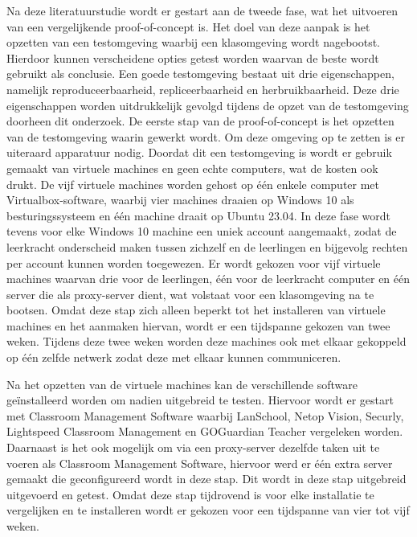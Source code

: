 Na deze literatuurstudie wordt er gestart aan de tweede fase, wat het uitvoeren van een vergelijkende proof-of-concept is. Het doel van deze aanpak is het opzetten van een testomgeving waarbij een klasomgeving wordt nagebootst. Hierdoor kunnen verscheidene opties getest worden waarvan de beste wordt gebruikt als conclusie. Een goede testomgeving bestaat uit drie eigenschappen, namelijk reproduceerbaarheid, repliceerbaarheid en herbruikbaarheid. Deze drie eigenschappen worden uitdrukkelijk gevolgd tijdens de opzet van de testomgeving doorheen dit onderzoek. De eerste stap van de proof-of-concept is het opzetten van de testomgeving waarin gewerkt wordt. Om deze omgeving op te zetten is er uiteraard apparatuur nodig. Doordat dit een testomgeving is wordt er gebruik gemaakt van virtuele machines en geen echte computers, wat de kosten ook drukt. De vijf virtuele machines worden gehost op één enkele computer met Virtualbox-software, waarbij vier machines draaien op Windows 10 als besturingssysteem en één machine draait op Ubuntu 23.04. In deze fase wordt tevens voor elke Windows 10 machine een uniek account aangemaakt, zodat de leerkracht onderscheid maken tussen zichzelf en de leerlingen en bijgevolg rechten per account kunnen worden toegewezen. Er wordt gekozen voor vijf virtuele machines waarvan drie voor de leerlingen, één voor de leerkracht computer en één server die als proxy-server dient, wat volstaat voor een klasomgeving na te bootsen. Omdat deze stap zich alleen beperkt tot het installeren van virtuele machines en het aanmaken hiervan, wordt er een tijdspanne gekozen van twee weken. Tijdens deze twee weken worden deze machines ook met elkaar gekoppeld op één zelfde netwerk zodat deze met elkaar kunnen communiceren. \newline

Na het opzetten van de virtuele machines kan de verschillende software geïnstalleerd worden om nadien uitgebreid te testen. Hiervoor wordt er gestart met Classroom Management Software waarbij LanSchool, Netop Vision, Securly, Lightspeed Classroom Management en GOGuardian Teacher vergeleken worden. Daarnaast is het ook mogelijk om via een proxy-server dezelfde taken uit te voeren als Classroom Management Software, hiervoor werd er één extra server gemaakt die geconfigureerd wordt in deze stap. Dit wordt in deze stap uitgebreid uitgevoerd en getest. Omdat deze stap tijdrovend is voor elke installatie te vergelijken en te installeren wordt er gekozen voor een tijdspanne van vier tot vijf weken.  \newline

